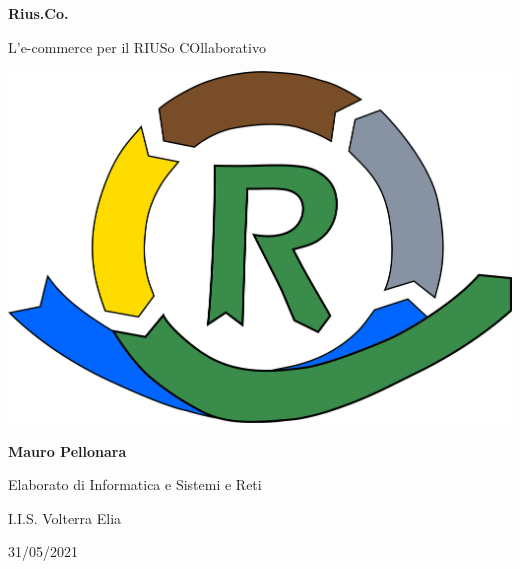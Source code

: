 \documentclass[italian, a4paper, 12pt]{article}
\begin{document}
\begin{titlepage}
    \begin{center}
        \vspace*{1cm}
        
        \textbf{\Huge Rius.Co.}

        \vspace{1cm}

        {\LARGE L'e-commerce per il RIUSo COllaborativo}

        \vfill

        {\includegraphics[scale=.42]{images/logo.png}}

        \vfill

        \textbf{\Large Mauro Pellonara}
        
        \vspace{1cm}
        
        {\large Elaborato di Informatica e Sistemi e Reti}
        
        \vspace{0.3cm}

        {\large I.I.S. Volterra Elia}
        
        \vspace{0.3cm}
        
        {\large 31/05/2021}
    \end{center}
\end{titlepage}

\tableofcontents
\newpage








\end{document}
